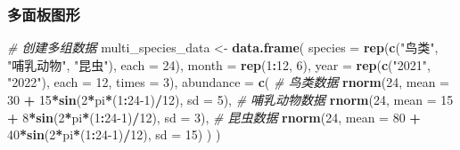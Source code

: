 \documentclass[
]{book}
\newenvironment{Shaded}{\begin{snugshade}}{\end{snugshade}}
\newcommand{\AttributeTok}[1]{\textcolor[rgb]{0.13,0.29,0.53}{#1}}
\newcommand{\CommentTok}[1]{\textcolor[rgb]{0.56,0.35,0.01}{\textit{#1}}}
\newcommand{\DecValTok}[1]{\textcolor[rgb]{0.00,0.00,0.81}{#1}}
\newcommand{\FunctionTok}[1]{\textcolor[rgb]{0.13,0.29,0.53}{\textbf{#1}}}
\newcommand{\NormalTok}[1]{#1}
\newcommand{\OtherTok}[1]{\textcolor[rgb]{0.56,0.35,0.01}{#1}}
\newcommand{\SpecialCharTok}[1]{\textcolor[rgb]{0.81,0.36,0.00}{\textbf{#1}}}
\newcommand{\StringTok}[1]{\textcolor[rgb]{0.31,0.60,0.02}{#1}}
\begin{document}
\hypertarget{ux591aux9762ux677fux56feux5f62}{%
\subsubsection{多面板图形}\label{ux591aux9762ux677fux56feux5f62}}

\begin{Shaded}
\begin{Highlighting}[]
\CommentTok{\# 创建多组数据}
\NormalTok{multi\_species\_data }\OtherTok{\textless{}{-}} \FunctionTok{data.frame}\NormalTok{(}
  \AttributeTok{species =} \FunctionTok{rep}\NormalTok{(}\FunctionTok{c}\NormalTok{(}\StringTok{"鸟类"}\NormalTok{, }\StringTok{"哺乳动物"}\NormalTok{, }\StringTok{"昆虫"}\NormalTok{), }\AttributeTok{each =} \DecValTok{24}\NormalTok{),}
  \AttributeTok{month =} \FunctionTok{rep}\NormalTok{(}\DecValTok{1}\SpecialCharTok{:}\DecValTok{12}\NormalTok{, }\DecValTok{6}\NormalTok{),}
  \AttributeTok{year =} \FunctionTok{rep}\NormalTok{(}\FunctionTok{c}\NormalTok{(}\StringTok{"2021"}\NormalTok{, }\StringTok{"2022"}\NormalTok{), }\AttributeTok{each =} \DecValTok{12}\NormalTok{, }\AttributeTok{times =} \DecValTok{3}\NormalTok{),}
  \AttributeTok{abundance =} \FunctionTok{c}\NormalTok{(}
    \CommentTok{\# 鸟类数据}
    \FunctionTok{rnorm}\NormalTok{(}\DecValTok{24}\NormalTok{, }\AttributeTok{mean =} \DecValTok{30} \SpecialCharTok{+} \DecValTok{15}\SpecialCharTok{*}\FunctionTok{sin}\NormalTok{(}\DecValTok{2}\SpecialCharTok{*}\NormalTok{pi}\SpecialCharTok{*}\NormalTok{(}\DecValTok{1}\SpecialCharTok{:}\DecValTok{24{-}1}\NormalTok{)}\SpecialCharTok{/}\DecValTok{12}\NormalTok{), }\AttributeTok{sd =} \DecValTok{5}\NormalTok{),}
    \CommentTok{\# 哺乳动物数据}
    \FunctionTok{rnorm}\NormalTok{(}\DecValTok{24}\NormalTok{, }\AttributeTok{mean =} \DecValTok{15} \SpecialCharTok{+} \DecValTok{8}\SpecialCharTok{*}\FunctionTok{sin}\NormalTok{(}\DecValTok{2}\SpecialCharTok{*}\NormalTok{pi}\SpecialCharTok{*}\NormalTok{(}\DecValTok{1}\SpecialCharTok{:}\DecValTok{24{-}1}\NormalTok{)}\SpecialCharTok{/}\DecValTok{12}\NormalTok{), }\AttributeTok{sd =} \DecValTok{3}\NormalTok{),}
    \CommentTok{\# 昆虫数据}
    \FunctionTok{rnorm}\NormalTok{(}\DecValTok{24}\NormalTok{, }\AttributeTok{mean =} \DecValTok{80} \SpecialCharTok{+} \DecValTok{40}\SpecialCharTok{*}\FunctionTok{sin}\NormalTok{(}\DecValTok{2}\SpecialCharTok{*}\NormalTok{pi}\SpecialCharTok{*}\NormalTok{(}\DecValTok{1}\SpecialCharTok{:}\DecValTok{24{-}1}\NormalTok{)}\SpecialCharTok{/}\DecValTok{12}\NormalTok{), }\AttributeTok{sd =} \DecValTok{15}\NormalTok{)}
\NormalTok{  )}
\NormalTok{)}


\end{Highlighting}
\end{Shaded}
\end{document}
